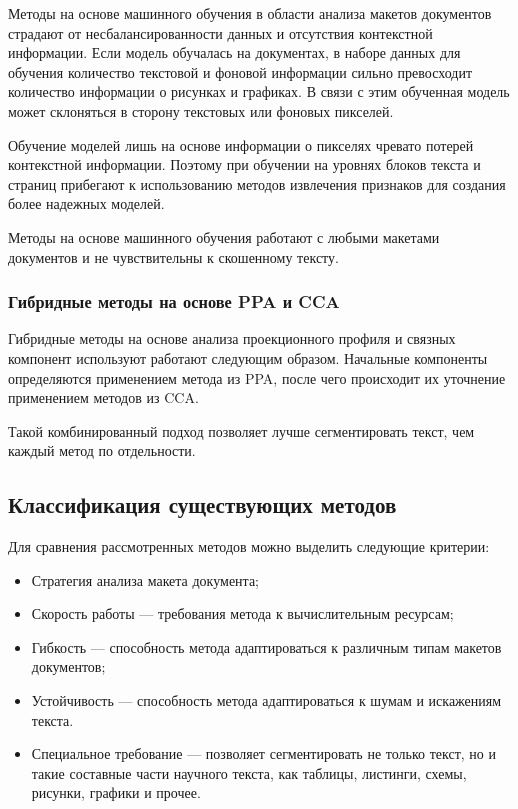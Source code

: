 Методы на основе машинного обучения в области анализа макетов документов страдают от несбалансированности данных и отсутствия контекстной информации.
Если модель обучалась на документах, в наборе данных для обучения количество текстовой и фоновой информации сильно превосходит количество информации о рисунках и графиках.
В связи с этим обученная модель может склоняться в сторону текстовых или фоновых пикселей.~\cite{dla-survey}

Обучение моделей лишь на основе информации о пикселях чревато потерей контекстной информации.
Поэтому при обучении на уровнях блоков текста и страниц прибегают к использованию методов извлечения признаков для создания более надежных моделей.~\cite{dla-survey}

Методы на основе машинного обучения работают с любыми макетами документов и не чувствительны к скошенному тексту.

\subsubsection{Гибридные методы на основе PPA и CCA}

Гибридные методы на основе анализа проекционного профиля и связных компонент используют работают следующим образом.
Начальные компоненты определяются применением метода из PPA, после чего происходит их уточнение применением методов из CCA.

Такой комбинированный подход позволяет лучше сегментировать текст, чем каждый метод по отдельности.

\subsection{Классификация существующих методов}


Для сравнения рассмотренных методов можно выделить следующие критерии:
\begin{itemize}
    \item Стратегия анализа макета документа;
    \item Скорость работы --- требования метода к вычислительным ресурсам;
    \item Гибкость --- способность метода адаптироваться к различным типам макетов документов;
    \item Устойчивость --- способность метода адаптироваться к шумам и искажениям текста.
    \item Специальное требование --- позволяет сегментировать не только текст, но и такие составные части научного текста, как таблицы, листинги, схемы, рисунки, графики и прочее.
\end{itemize}

